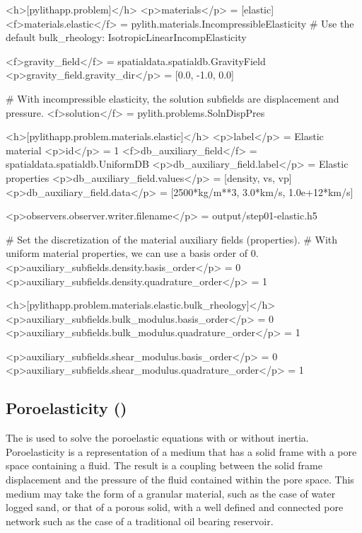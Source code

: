 \begin{cfg}
  <h>[pylithapp.problem]</h>
  <p>materials</p> = [elastic]
  <f>materials.elastic</f> = pylith.materials.IncompressibleElasticity
  # Use the default bulk_rheology: IsotropicLinearIncompElasticity

  <f>gravity_field</f> = spatialdata.spatialdb.GravityField
  <p>gravity_field.gravity_dir</p> = [0.0, -1.0, 0.0]

  # With incompressible elasticity, the solution subfields are displacement and pressure.
  <f>solution</f> = pylith.problems.SolnDispPres

    <h>[pylithapp.problem.materials.elastic]</h>
  <p>label</p> = Elastic material
  <p>id</p> = 1
  <f>db_auxiliary_field</f> = spatialdata.spatialdb.UniformDB
  <p>db_auxiliary_field.label</p> = Elastic properties
  <p>db_auxiliary_field.values</p> = [density, vs, vp]
  <p>db_auxiliary_field.data</p> = [2500*kg/m**3, 3.0*km/s, 1.0e+12*km/s]

  <p>observers.observer.writer.filename</p> = output/step01-elastic.h5

  # Set the discretization of the material auxiliary fields (properties).
  # With uniform material properties, we can use a basis order of 0.
  <p>auxiliary_subfields.density.basis_order</p> = 0
  <p>auxiliary_subfields.density.quadrature_order</p> = 1

    <h>[pylithapp.problem.materials.elastic.bulk_rheology]</h>
  <p>auxiliary_subfields.bulk_modulus.basis_order</p> = 0
  <p>auxiliary_subfields.bulk_modulus.quadrature_order</p> = 1

  <p>auxiliary_subfields.shear_modulus.basis_order</p> = 0
  <p>auxiliary_subfields.shear_modulus.quadrature_order</p> = 1
\end{cfg}

\subsection{Poroelasticity (\protect{})}

The  is used to solve the poroelastic equations with
or without inertia. Poroelasticity is a representation of a medium that has
a solid frame with a pore space containing a fluid. The result is a coupling
between the solid frame displacement and the pressure of the fluid contained
within the pore space. This medium may take the form of a granular material,
such as the case of water logged sand, or that of a porous solid, with a
well defined and connected pore network such as the case of a traditional
oil bearing reservoir.\\

